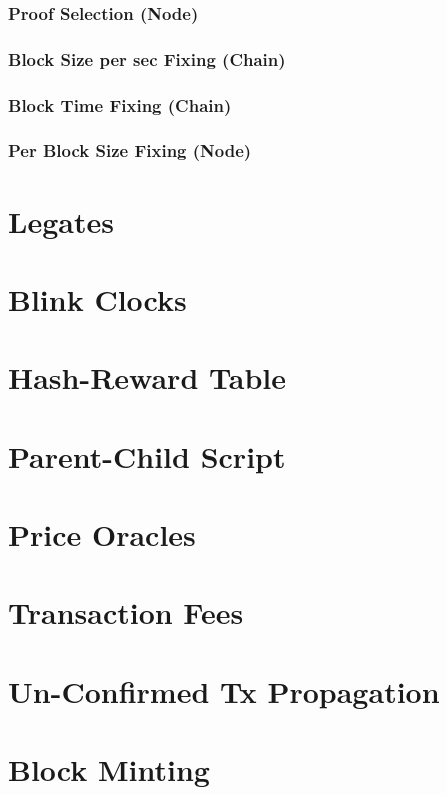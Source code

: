 \documentclass[a4paper,11pt]{article}
\begin{document}
\subsubsection{Proof Selection (Node)}
\subsubsection{Block Size per sec Fixing (Chain)}
\subsubsection{Block Time Fixing (Chain)}
\subsubsection{Per Block Size Fixing (Node)}

\section{Legates}

\section{Blink Clocks}

\section{Hash-Reward Table}

\section{Parent-Child Script}

\section{Price Oracles}

\section{Transaction Fees}

\section{Un-Confirmed Tx Propagation}

\section{Block Minting}
\end{document}
